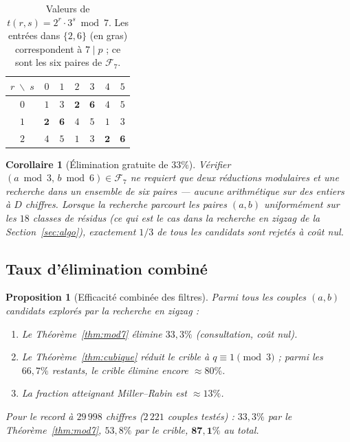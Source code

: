 \documentclass[11pt,a4paper]{article}
\newtheorem{proposition}[theoreme]{Proposition}
\newtheorem{corollaire}[theoreme]{Corollaire}
\theoremstyle{definition}
\theoremstyle{remark}
\newcommand{\F}{\mathcal{F}}
\begin{document}
\begin{table}[ht]\centering
\caption{Valeurs de $t(r,s)=2^r\cdot 3^s\bmod 7$.
Les entrées dans $\{2,6\}$ (en gras) correspondent à $7\mid p$ ;
ce sont les six paires de $\F_7$.}
\label{tab:valeurs-t}
\begin{tabular}{@{}c|cccccc@{}}
\toprule
$r\;\backslash\; s$ & $0$ & $1$ & $2$ & $3$ & $4$ & $5$ \\
\midrule
$0$ & $1$ & $3$ & $\mathbf{2}$ & $\mathbf{6}$ & $4$ & $5$ \\
$1$ & $\mathbf{2}$ & $\mathbf{6}$ & $4$ & $5$ & $1$ & $3$ \\
$2$ & $4$ & $5$ & $1$ & $3$ & $\mathbf{2}$ & $\mathbf{6}$ \\
\bottomrule
\end{tabular}
\end{table}

\begin{corollaire}[Élimination gratuite de $33\%$]\label{cor:t2-gratuit}
Vérifier $(a\bmod 3,\,b\bmod 6)\in\F_7$ ne requiert que deux réductions
modulaires et une recherche dans un ensemble de six paires — aucune
arithmétique sur des entiers à $D$ chiffres. Lorsque la recherche parcourt
les paires $(a,b)$ uniformément sur les $18$ classes de résidus
(ce qui est le cas dans la recherche en zigzag de la
Section~\ref{sec:algo}), exactement $1/3$ de tous les candidats sont
rejetés à coût nul.
\end{corollaire}

\subsection{Taux d'élimination combiné}

\begin{proposition}[Efficacité combinée des filtres]\label{prop:combine}
Parmi tous les couples $(a,b)$ candidats explorés par la recherche en
zigzag :
\begin{enumerate}[label=(\roman*)]
\item Le Théorème~\ref{thm:mod7} élimine $33{,}3\%$ (consultation, coût nul).
\item Le Théorème~\ref{thm:cubique} réduit le crible à $q\equiv 1\pmod{3}$ ;
  parmi les $66{,}7\%$ restants, le crible élimine encore $\approx 80\%$.
\item La fraction atteignant Miller--Rabin est $\approx 13\%$.
\end{enumerate}
Pour le record à $29\,998$ chiffres ($2\,221$ couples testés) :
$33{,}3\%$ par le Théorème~\ref{thm:mod7},
$53{,}8\%$ par le crible,
$\mathbf{87{,}1\%}$ au total.
\end{proposition}
\end{document}
